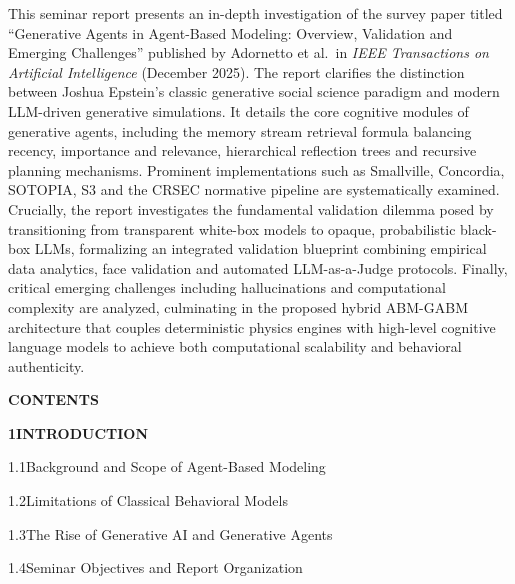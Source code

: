 \documentclass[12pt,a4paper]{report}
\begin{document}
This seminar report presents an in-depth investigation of the survey paper titled ``Generative Agents in Agent-Based Modeling: Overview, Validation and Emerging Challenges'' published by Adornetto et al.~in \textit{IEEE Transactions on Artificial Intelligence} (December 2025). The report clarifies the distinction between Joshua Epstein's classic generative social science paradigm and modern LLM-driven generative simulations. It details the core cognitive modules of generative agents, including the memory stream retrieval formula balancing recency, importance and relevance, hierarchical reflection trees and recursive planning mechanisms. Prominent implementations such as Smallville, Concordia, SOTOPIA, S3 and the CRSEC normative pipeline are systematically examined. Crucially, the report investigates the fundamental validation dilemma posed by transitioning from transparent white-box models to opaque, probabilistic black-box LLMs, formalizing an integrated validation blueprint combining empirical data analytics, face validation and automated LLM-as-a-Judge protocols. Finally, critical emerging challenges including hallucinations and computational complexity are analyzed, culminating in the proposed hybrid ABM-GABM architecture that couples deterministic physics engines with high-level cognitive language models to achieve both computational scalability and behavioral authenticity.

\clearpage


\clearpage
\thispagestyle{plain}
\begin{center}
{\fontsize{18}{22}\selectfont\bfseries CONTENTS}\par
\end{center}
\vspace{0.8cm}

\noindent\textbf{1\quad INTRODUCTION}\dotfill\textbf{\pageref{chap:intro}}\par
\vspace{3pt}
\noindent\hspace{0.3in}1.1\quad Background and Scope of Agent-Based Modeling\dotfill\pageref{sec:background}\par
\vspace{2pt}
\noindent\hspace{0.3in}1.2\quad Limitations of Classical Behavioral Models\dotfill\pageref{sec:limitations}\par
\vspace{2pt}
\noindent\hspace{0.3in}1.3\quad The Rise of Generative AI and Generative Agents\dotfill\pageref{sec:genai_shift}\par
\vspace{2pt}
\noindent\hspace{0.3in}1.4\quad Seminar Objectives and Report Organization\dotfill\pageref{sec:report_objectives}\par
\vspace{6pt}
\end{document}
